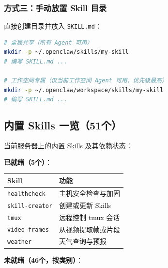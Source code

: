 \subsubsection{方式三：手动放置 Skill 目录}


直接创建目录并放入 \texttt{SKILL.md}：

\begin{lstlisting}[language=bash]
# 全局共享（所有 Agent 可用）
mkdir -p ~/.openclaw/skills/my-skill
# 编写 SKILL.md ...

# 工作空间专属（仅当前工作空间 Agent 可用，优先级最高）
mkdir -p ~/.openclaw/workspace/skills/my-skill
# 编写 SKILL.md ...
\end{lstlisting}

\subsection{内置 Skills 一览（51个）}


当前服务器上的内置 Skills 及其依赖状态：

\textbf{已就绪（5个）}：

\begin{table}[h]
\centering
\small
\begin{tabular}{|l|l|}
\hline
Skill & 功能 \\
\hline
\texttt{healthcheck} & 主机安全检查与加固 \\
\hline
\texttt{skill-creator} & 创建或更新 Skills \\
\hline
\texttt{tmux} & 远程控制 tmux 会话 \\
\hline
\texttt{video-frames} & 从视频提取帧或片段 \\
\hline
\texttt{weather} & 天气查询与预报 \\
\hline
\end{tabular}
\end{table}

\textbf{未就绪（46个，按类别）}：

